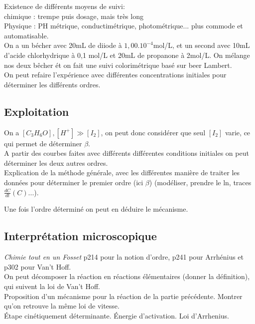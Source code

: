 \documentclass[12pt,prb,aps,epsf]{article}
\begin{document}
Existence de différents moyens de suivi:\\
 chimique : trempe puis dosage, mais très long\\
 Physique : PH métrique, conductimétrique, photométrique... plus commode et automatisable.\\

On a un bécher avec 20mL de diiode à $1,00.10^{-4}$mol/L, et un second avec 10mL d'acide chlorhydrique à 0,1 mol/L et 20mL de propanone à 2mol/L. On mélange nos deux bêcher ét on fait une suivi colorimétrique basé sur beer Lambert.\\
On peut refaire l'expérience avec différentes concentrations initiales pour déterminer les différents ordres.

\subsection{Exploitation}
On a $[C_3H_6O], [H^+] \gg [I_2]$, on peut donc considérer que seul $[I_2]$ varie, ce qui permet de déterminer $\beta$.\\
A partir des courbes faites avec différents différentes conditions initiales on peut déterminer les deux autres ordres.\\

Explication de la méthode générale, avec les différentes manière de traiter les données pour déterminer le premier ordre (ici $\beta$) (modéliser, prendre le ln, traces $\frac{dC}{dt}(C)$...).

Une fois l'ordre déterminé on peut en déduire le mécanisme.

\subsection{Interprétation microscopique}
\textit{Chimie tout en un Fosset} p214 pour la notion d'ordre, p241 pour Arrhénius et p302 pour Van't Hoff.\\

On peut décomposer la réaction en réactions élémentaires (donner la définition), qui suivent la loi de Van't Hoff.\\

Proposition d'un mécanisme pour la réaction de la partie précédente. Montrer qu'on retrouve la même loi de vitesse.\\

Étape cinétiquement déterminante. Énergie d'activation. Loi d'Arrhenius.\\
\end{document}
